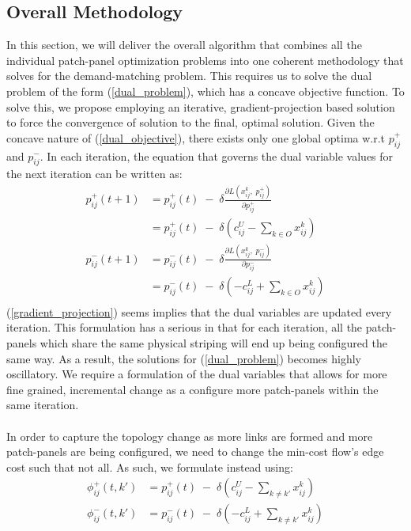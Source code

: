 \documentclass[sigconf]{acmart}
\begin{document}
\subsection{Overall Methodology}
In this section, we will deliver the overall algorithm that combines all the individual patch-panel optimization problems into one coherent methodology that solves for the demand-matching problem. This requires us to solve the dual problem of the form (\ref{dual_problem}), which has a concave objective function. To solve this, we propose employing an iterative, gradient-projection based solution to force the convergence of solution to the final, optimal solution. Given the concave nature of (\ref{dual_objective}), there exists only one global optima w.r.t $p_{ij}^+$ and $p_{ij}^-$. In each iteration, the equation that governs the dual variable values for the next iteration can be written as:
\begin{equation}\label{gradient_projection}
\begin{aligned}
p_{ij}^{+}(t + 1) &= p_{ij}^{+}(t) \; - \; \delta \frac{\partial L(x_{ij}^k, \; p_{ij}^{+})}{\partial p_{ij}^{+}}\\
&= p_{ij}^{+}(t) \; - \; \delta (c_{ij}^U - \sum_{k \in O}x_{ij}^k) \\
p_{ij}^{-}(t + 1) &= p_{ij}^{-}(t) \; - \; \delta \frac{\partial L(x_{ij}^k, \; p_{ij}^{-})}{\partial p_{ij}^{-}}\\
&= p_{ij}^{-}(t) \; - \; \delta (- c_{ij}^L + \sum_{k \in O}x_{ij}^k) \\
\end{aligned}
\end{equation}
(\ref{gradient_projection}) seems implies that the dual variables are updated every iteration. This formulation has a serious in that for each iteration, all the patch-panels which share the same physical striping will end up being configured the same way. As a result, the solutions for (\ref{dual_problem}) becomes highly oscillatory. We require a formulation of the dual variables that allows for more fine grained, incremental change as a configure more patch-panels within the same iteration. \\\\
In order to capture the topology change as more links are formed and more patch-panels are being configured, we need to change the min-cost flow's edge cost such that not all. As such, we formulate instead using: 
\begin{equation}\label{gradient_projection_improved}
\begin{aligned}
    \phi_{ij}^{+}(t,k') &= p_{ij}^{+}(t) \; - \; \delta ( c_{ij}^U - \sum_{k \neq k'}x_{ij}^{k})\\
    \phi_{ij}^{-}(t,k') &= p_{ij}^{-}(t) \; - \; \delta (- c_{ij}^L + \sum_{k \neq k'}x_{ij}^{k})\\
\end{aligned}
\end{equation}
\end{document}
